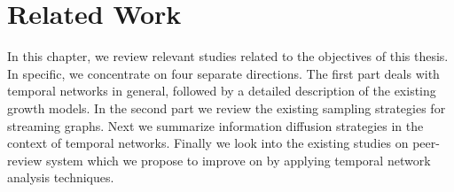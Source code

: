 \chapter[Related Work]{Related Work} In this chapter, we review relevant studies related to the objectives of this thesis. In specific, we concentrate on four separate directions. 
The first part deals with temporal networks in general, followed by a detailed description of the existing growth models. In the second part we review the existing sampling strategies for streaming graphs. 
Next we summarize information diffusion strategies in the context of temporal networks. 
Finally we look into the existing studies on peer-review system which we propose to improve on by applying temporal network analysis techniques. 




